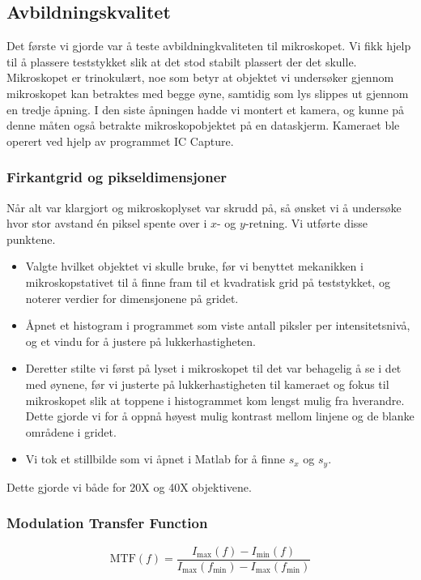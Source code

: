 \documentclass[a4paper,11pt, twocolumn]{article}
\begin{document}
\subsection{Avbildningskvalitet}
Det første vi gjorde var å teste avbildningkvaliteten til mikroskopet. Vi fikk hjelp til å plassere teststykket slik at det stod stabilt plassert der det skulle. Mikroskopet er trinokulært, noe som betyr at objektet vi undersøker gjennom mikroskopet kan betraktes med begge øyne, samtidig som lys slippes ut gjennom en tredje åpning. I den siste åpningen hadde vi montert et kamera, og kunne på denne måten også betrakte mikroskopobjektet på en dataskjerm. Kameraet ble operert ved hjelp av programmet IC Capture.


\subsubsection{Firkantgrid og pikseldimensjoner}
Når alt var klargjort og mikroskoplyset var skrudd på, så ønsket vi å undersøke hvor stor avstand \'en piksel spente over i $x$- og $y$-retning. Vi utførte disse punktene.

\begin{itemize}
	\item Valgte hvilket objektet vi skulle bruke, før vi benyttet mekanikken i mikroskopstativet til å finne fram til et kvadratisk grid på teststykket, og noterer verdier for dimensjonene på gridet.
	\item Åpnet et histogram i programmet som viste antall piksler per intensitetsnivå, og et vindu for å justere på lukkerhastigheten.
	\item Deretter stilte vi først på lyset i mikroskopet til det var behagelig å se i det med øynene, før vi justerte på lukkerhastigheten til kameraet og fokus til mikroskopet slik at toppene i histogrammet kom lengst mulig fra hverandre. Dette gjorde vi for å oppnå høyest mulig kontrast mellom linjene og de blanke områdene i gridet.
	\item Vi tok et stillbilde som vi åpnet i Matlab for å finne $s_x$ og $s_y$. 
\end{itemize}

Dette gjorde vi både for 20X og 40X objektivene.

\subsubsection{Modulation Transfer Function}
\begin{equation}
	\text{MTF}(f) = \frac{I_{\max}(f)-I_{\min}(f)}{I_{\max}(f_{\min})-I_{\max}(f_{\min})}
	\label{eq:MTF}
\end{equation}
\end{document}
